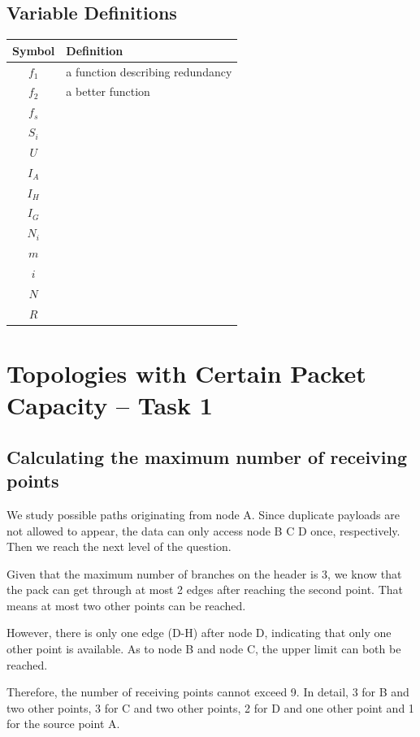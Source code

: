 \documentclass{mcmthesis}
\begin{document}
\subsection{Variable Definitions}
\begin{center}
	\begin{tabular}{cl}
		\hline
		Symbol & Definition \\
		\hline
		$f_{1}$ & a function describing redundancy\\
		$f_{2}$ & a better function \\ 
		$f_{s}$ & \\ 
		$S_{i}$ & \\ 
		$U$ & \\
		$I_{A}$ & \\
		$I_{H}$ & \\
		$I_{G}$ & \\
		$N_{i}$ & \\
		$m$ & \\
		$i$ & \\
		$N$ & \\
		$R$ & \\
		\hline
	\end{tabular}
\end{center}

\section{Topologies with Certain Packet Capacity -- Task 1}
\subsection{Calculating the maximum number of receiving points}

We study possible paths originating from node A. Since duplicate payloads are not allowed to appear, the data can only access node B C D once, respectively. Then we reach the next level of the question. 

Given that the maximum number of branches on the header is 3, we know that the pack can get through at most 2 edges after reaching the second point. That means at most two other points can be reached. 

However, there is only one edge (D-H) after node D, indicating that only one other point is available. As to node B and node C, the upper limit can both be reached.

Therefore, the number of receiving points cannot exceed 9. In detail, 3 for B and two other points, 3 for C and two other points, 2 for D and one other point and 1 for the source point A.
\end{document}
